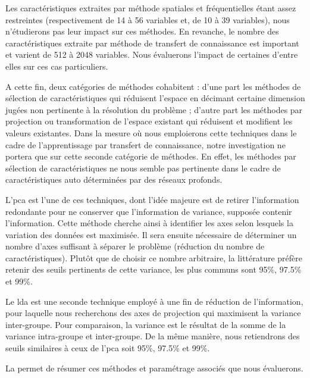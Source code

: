 Les caractéristiques extraites par méthode spatiales et fréquentielles étant assez restreintes (respectivement de 14 à 56 variables et, de 10 à 39 variables), nous n'étudierons pas leur impact sur ces méthodes. En revanche, le nombre des caractéristiques extraite par méthode de transfert de connaissance est important et varient de 512 à 2048 variables. Nous évaluerons l'impact de certaines d'entre elles sur ces cas particuliers.\par

A cette fin, deux catégories de méthodes cohabitent : d'une part les méthodes de sélection de caractéristiques qui réduisent l'espace en décimant certaine dimension jugées non pertinente à la résolution du problème ; d'autre part les méthodes par projection ou transformation de l'espace existant qui réduisent et modifient les valeurs existantes. Dans la mesure où nous emploierons cette techniques dans le cadre de l'apprentissage par transfert de connaissance, notre investigation ne portera que sur cette seconde catégorie de méthodes. En effet, les méthodes par sélection de caractéristiques ne nous semble pas pertinente dans le cadre de caractéristiques auto déterminées par des réseaux profonds.\par

L'\gls{pca} est l'une de ces techniques, dont l'idée majeure est de retirer l'information redondante pour ne conserver que l'information de variance, supposée contenir l'information. Cette méthode cherche ainsi à identifier les axes selon lesquels la variation des données est maximisée. Il sera ensuite nécessaire de déterminer un nombre d'axes suffisant à séparer le problème (réduction du nombre de caractéristiques). Plutôt que de choisir ce nombre arbitraire, la littérature préfère retenir des seuils pertinents de cette variance, les plus communs sont 95\%, 97.5\% et 99\%.\par

Le \gls{lda} est une seconde technique employé à une fin de réduction de l'information, pour laquelle nous recherchons des axes de projection qui maximisent la variance inter-groupe. Pour comparaison, la variance est le résultat de la somme de la variance intra-groupe et inter-groupe. De la même manière, nous retiendrons des seuils similaires à ceux de l'\gls{pca} soit 95\%, 97.5\% et 99\%.\par

La  permet de résumer ces méthodes et paramétrage associés que nous évaluerons.\par 

